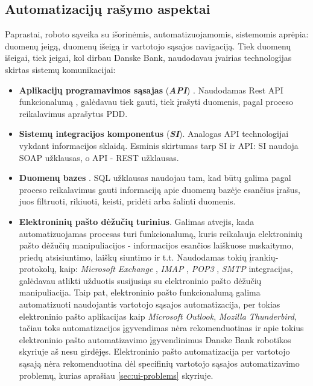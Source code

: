 \documentclass{VUMIFPSBakPrakAt}
\begin{document}
\subsection{Automatizacijų rašymo aspektai}

Paprastai, roboto sąveika su išorinėmis, automatizuojamomis, sistemomis aprėpia: duomenų įeigą, duomenų išeigą ir vartotojo sąsajos navigaciją. Tiek duomenų išeigai, tiek įeigai, kol dirbau Danske Bank, naudodavau įvairias technologijas skirtas sistemų komunikacijai:
\vspace{10pt}
\begin{itemize}
    \item \textbf{Aplikacijų programavimos sąsajas} (\textbf{\textit{API}}) \cite{de2017api}. Naudodamas Rest API funkcionalumą \cite{masse2011rest}, galėdavau tiek gauti, tiek įrašyti duomenis, pagal proceso reikalavimus aprašytus PDD.
    \item \textbf{Sistemų integracijos komponentus} (\textbf{\textit{SI}}). Analogas API technologijai vykdant informacijos sklaidą. Esminis skirtumas tarp SI ir API: SI naudoja SOAP \cite{gudgin2003soap} užklausas, o API - REST užklausas.
    \item \textbf{Duomenų bazes} \cite{maier1983theory}. SQL užklausas \cite{melton1993understanding} naudojau tam, kad būtų galima pagal proceso reikalavimus gauti informaciją apie duomenų bazėje esančius įrašus, juos filtruoti, rikiuoti, keisti, pridėti arba šalinti duomenis.
    \item \textbf{Elektroninių pašto dėžučių turinius}. Galimas atvejis, kada automatizuojamas procesas turi funkcionalumą, kuris reikalauja elektroninių pašto dėžučių manipuliacijos - informacijos esančios laiškuose nuskaitymo, priedų atsisiuntimo, laiškų siuntimo ir t.t. Naudodamas tokių įrankių-protokolų, kaip: \textit{Microsoft Exchange} \cite{elfassy2013mastering}, \textit{IMAP} \cite{rfc3501}, \textit{POP3} \cite{rfc1939}, \textit{SMTP} \cite{rfc821} integracijas, galėdavau atlikti užduotis susijusiąs su elektroninio pašto dėžučių manipuliacija. Taip pat, elektroninio pašto funkcionalumą galima automatizuoti naudojantis vartotojo sąsajos automatizacija, per tokias elektroninio pašto aplikacijas kaip \textit{Microsoft Outlook}, \textit{Mozilla Thunderbird}, tačiau toks automatizacijos įgyvendimas nėra rekomenduotinas ir apie tokius elektroninio pašto automatizavimo įgyvendinimus Danske Bank robotikos skyriuje aš nesu girdėjęs. Elektroninio pašto automatizacija per vartotojo sąsają nėra rekomenduotina dėl specifinių vartotojo sąsajos automatizavimo problemų, kurias aprašiau \ref{sec:ui-problems} skyriuje.

\end{itemize}
\end{document}
